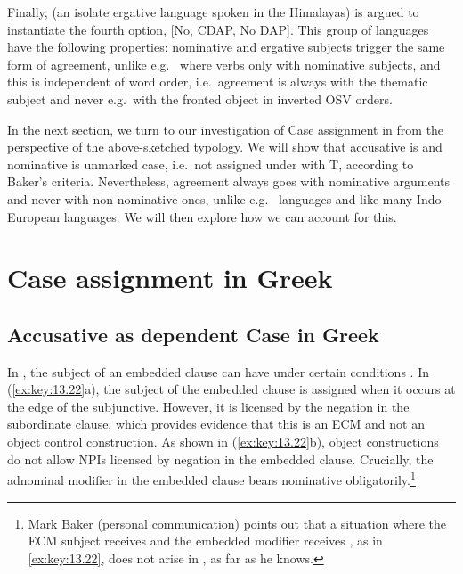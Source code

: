 \documentclass[output=paper]{langsci/langscibook}
\begin{document}
Finally,  (an isolate ergative language spoken in the Himalayas) is
argued to instantiate the fourth option, [No, CDAP, No DAP]. This group of
languages have the following properties: nominative and ergative subjects
trigger the same form of agreement, unlike e.g.\  where verbs  only
with nominative subjects, and this is independent of word order, i.e.\ agreement
is always with the thematic subject and never e.g.\ with the fronted object in
inverted OSV orders.

In the next section, we turn to our investigation of Case assignment in
 from the perspective of the above-sketched typology. We will show
that accusative is  and
nominative is unmarked case, i.e.\ not assigned under
 with T, according to Baker’s criteria. Nevertheless, agreement
always goes with nominative arguments and never with
non-nominative ones, unlike e.g.\  languages and like many Indo-European
languages. We will then explore how we can account for this.

\section{Case assignment in Greek}

\subsection{Accusative as dependent Case in Greek}

In , the subject of an embedded clause can have \Acc{} under certain
conditions \parencite{Iatridou1993,KotzPapa2007}. In (\ref{ex:key:13.22}a), the
subject of the embedded clause is assigned \Acc{} when it occurs at the edge of
the subjunctive. However, it is licensed by the negation in the subordinate
clause, which provides evidence that this is an \gls{ECM} and not an object
control construction. As shown in (\ref{ex:key:13.22}b), object 
constructions do not allow \glspl{NPI} licensed by negation in the embedded
clause.  Crucially, the adnominal modifier in the embedded clause bears
nominative obligatorily.\footnote{Mark Baker (personal
    communication) points out that a situation where the \gls{ECM} subject
receives \Acc{} and the embedded modifier receives \Nom{}, as in
\eqref{ex:key:13.22}, does not arise in , as far as he knows.}
\end{document}

